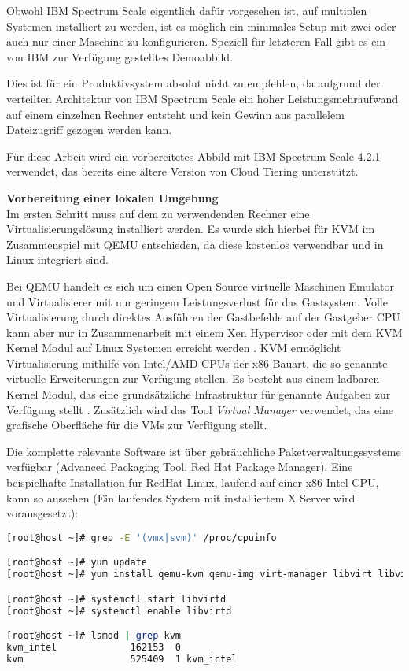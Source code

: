 Obwohl IBM Spectrum Scale eigentlich dafür vorgesehen ist, auf multiplen Systemen installiert zu werden, ist es möglich ein minimales Setup mit zwei oder auch nur einer Maschine zu konfigurieren. Speziell für letzteren Fall gibt es ein von IBM zur Verfügung gestelltes Demoabbild.

Dies ist für ein Produktivsystem absolut nicht zu empfehlen, da aufgrund der verteilten Architektur von IBM Spectrum Scale ein hoher Leistungsmehraufwand auf einem einzelnen Rechner entsteht und kein Gewinn aus parallelem Dateizugriff gezogen werden kann.

Für diese Arbeit wird ein vorbereitetes Abbild mit IBM Spectrum Scale 4.2.1 verwendet, das bereits eine ältere Version von Cloud Tiering unterstützt.

\textbf{Vorbereitung einer lokalen Umgebung}\\
Im ersten Schritt muss auf dem zu verwendenden Rechner eine Virtualisierungslösung installiert werden. Es wurde sich hierbei für \ac{KVM} im Zusammenspiel mit \ac{QEMU} entschieden, da diese kostenlos verwendbar und in Linux integriert sind. 

Bei QEMU handelt es sich um einen Open Source virtuelle Maschinen Emulator und Virtualisierer mit nur geringem Leistungsverlust für das Gastsystem. Volle Virtualisierung durch direktes Ausführen der Gastbefehle auf der Gastgeber CPU kann aber nur in Zusammenarbeit mit einem Xen Hypervisor oder mit dem KVM Kernel Modul auf Linux Systemen erreicht werden \parencite{qemu.2017}. 
KVM ermöglicht Virtualisierung mithilfe von Intel/AMD CPUs der x86 Bauart, die so genannte virtuelle Erweiterungen zur Verfügung stellen. Es besteht aus einem ladbaren Kernel Modul, das eine grundsätzliche Infrastruktur für genannte Aufgaben zur Verfügung stellt \parencite{kvm.2017}.
Zusätzlich wird das Tool \textit{Virtual Manager} verwendet, das eine grafische Oberfläche für die \acs{VM}s zur Verfügung stellt.

Die komplette relevante Software ist über gebräuchliche Paketverwaltungssysteme verfügbar (Advanced Packaging Tool, Red Hat Package Manager). Eine beispielhafte Installation für RedHat Linux, laufend auf einer x86 Intel CPU, kann so aussehen (Ein laufendes System mit installiertem X Server wird vorausgesetzt):\\ 

\begin{lstlisting}[language=bash, caption=Einrichtung von KVM und QEMU]
[root@host ~]# grep -E '(vmx|svm)' /proc/cpuinfo 

[root@host ~]# yum update
[root@host ~]# yum install qemu-kvm qemu-img virt-manager libvirt libvirt-python libvirt-client virt-install virt-viewer bridge-utils

[root@host ~]# systemctl start libvirtd
[root@host ~]# systemctl enable libvirtd

[root@host ~]# lsmod | grep kvm
kvm_intel             162153  0
kvm                   525409  1 kvm_intel
\end{lstlisting} 

